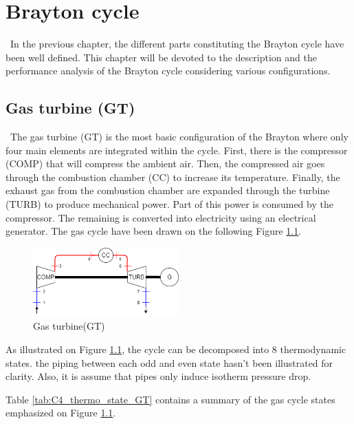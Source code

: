 \graphicspath{{Chapter_4_-_Brayton_cycle/Images/}}
\chapter{Brayton cycle}
\quad\, In the previous chapter, the different parts constituting the Brayton cycle have been well defined. This chapter will be devoted to the description and the performance analysis of the Brayton cycle considering various configurations.

\section{Gas turbine (GT)}
\quad\, The gas turbine (GT) is the most basic configuration of the Brayton where only four main elements are integrated within the cycle. First, there is the compressor (COMP) that will compress the ambient air. Then, the compressed air goes through the combustion chamber (CC) to increase its temperature. Finally, the exhaust gas from the combustion chamber are expanded through the turbine (TURB) to produce mechanical power. Part of this power is consumed by the compressor. The remaining is converted into electricity using an electrical generator. The gas cycle have been drawn on the following Figure \ref{fig:C4_BraytonGT}.

\begin{figure}[h]
\centering
\includegraphics[width=0.5\textwidth]{GT}
\caption{Gas turbine(GT)}
\label{fig:C4_BraytonGT}
\end{figure}



As illustrated on Figure \ref{fig:C4_BraytonGT}, the cycle can be decomposed into 8 thermodynamic states. the piping between each odd and even state hasn't been illustrated for clarity. Also, it is assume that pipes only induce isotherm pressure drop.

Table \ref{tab:C4_thermo_state_GT} contains a summary of the gas cycle states emphasized on Figure \ref{fig:C4_BraytonGT}.

